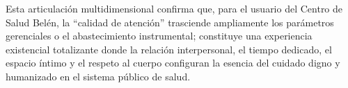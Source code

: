Esta articulación multidimensional confirma que, para el usuario del Centro de Salud Belén, la ``calidad de atención'' trasciende ampliamente los parámetros gerenciales o el abastecimiento instrumental; constituye una experiencia existencial totalizante donde la relación interpersonal, el tiempo dedicado, el espacio íntimo y el respeto al cuerpo configuran la esencia del cuidado digno y humanizado en el sistema público de salud.

\newpage
